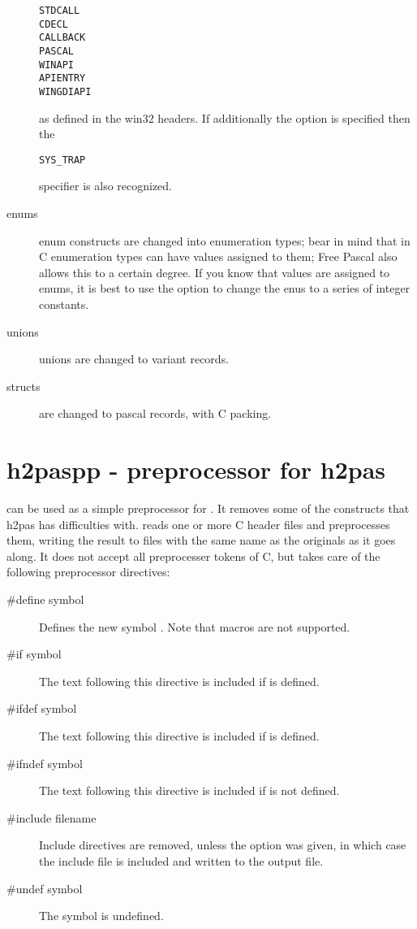\begin{description}
\begin{verbatim}
STDCALL
CDECL
CALLBACK
PASCAL
WINAPI
APIENTRY
WINGDIAPI
\end{verbatim}
as defined in the win32 headers. If additionally the 
option is specified then the  
\begin{verbatim}
SYS_TRAP
\end{verbatim}
specifier is also recognized.
\item[enums]
enum constructs are changed into enumeration types; bear in mind that in C
enumeration types can have values assigned to them; Free Pascal also allows
this to a certain degree. If you know that values are assigned to enums, it
is best to use the  option to change the enus to a series of integer 
constants.

\item[unions] unions are changed to variant records. 
\item[structs] are changed to pascal records, with C packing.
\end{description}

\section{h2paspp - preprocessor for h2pas}
 can be used as a simple preprocessor for . It
removes some of the constructs that h2pas has difficulties with. 
 reads one or more C header files and preprocesses them, writing the result 
to files with the same name as the originals as it goes along. 
It does not accept all preprocesser tokens of C, but takes care of the following 
preprocessor directives:

\begin{description}
\item [\#define symbol] Defines the new symbol . Note that macros are not supported.
\item [\#if symbol] The text following this directive is included if  is defined.
\item [\#ifdef symbol] The text following this directive is included if  is defined. 
\item [\#ifndef symbol] The text following this directive is included if  is not defined.
\item [\#include filename] Include directives are removed, unless the  option was given, 
in which case the include file is included and written to the output file.
\item[\#undef symbol] The symbol  is undefined.
\end{description}


